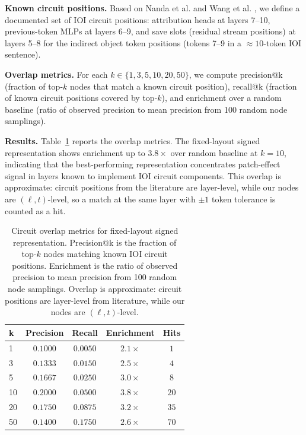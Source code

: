 \documentclass[11pt,a4paper]{article}
\begin{document}
\textbf{Known circuit positions.} Based on Nanda et al. \cite{nanda2023attribution} and Wang et al. \cite{wang2023localizing}, we define a documented set of IOI circuit positions: attribution heads at layers 7--10, previous-token MLPs at layers 6--9, and save slots (residual stream positions) at layers 5--8 for the indirect object token positions (tokens 7--9 in a $\approx 10$-token IOI sentence).

\textbf{Overlap metrics.} For each $k \in \{1, 3, 5, 10, 20, 50\}$, we compute precision@k (fraction of top-$k$ nodes that match a known circuit position), recall@k (fraction of known circuit positions covered by top-$k$), and enrichment over a random baseline (ratio of observed precision to mean precision from 100 random node samplings).

\textbf{Results.} Table~\ref{tab:circuit_overlap} reports the overlap metrics. The fixed-layout signed representation shows enrichment up to $3.8\times$ over random baseline at $k=10$, indicating that the best-performing representation concentrates patch-effect signal in layers known to implement IOI circuit components. This overlap is approximate: circuit positions from the literature are layer-level, while our nodes are $(\ell, t)$-level, so a match at the same layer with $\pm 1$ token tolerance is counted as a hit.

\begin{table}[H]
\centering
\small
\begin{tabular}{lcccc}
\toprule
\textbf{k} & \textbf{Precision} & \textbf{Recall} & \textbf{Enrichment} & \textbf{Hits} \\
\midrule
1 & $0.1000$ & $0.0050$ & $2.1\times$ & $1$ \\
3 & $0.1333$ & $0.0150$ & $2.5\times$ & $4$ \\
5 & $0.1667$ & $0.0250$ & $3.0\times$ & $8$ \\
10 & $0.2000$ & $0.0500$ & $3.8\times$ & $20$ \\
20 & $0.1750$ & $0.0875$ & $3.2\times$ & $35$ \\
50 & $0.1400$ & $0.1750$ & $2.6\times$ & $70$ \\
\bottomrule
\end{tabular}
\caption{Circuit overlap metrics for fixed-layout signed representation. Precision@k is the fraction of top-$k$ nodes matching known IOI circuit positions. Enrichment is the ratio of observed precision to mean precision from 100 random node samplings. Overlap is approximate: circuit positions are layer-level from literature, while our nodes are $(\ell, t)$-level.}
\label{tab:circuit_overlap}
\end{table}
\end{document}
